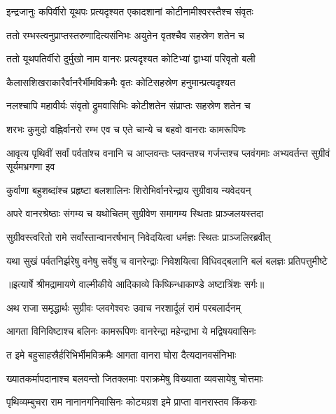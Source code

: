 \twolineshloka
{इन्द्रजानुः कपिर्वीरो यूथपः प्रत्यदृश्यत}
{एकादशानां कोटीनामीश्वरस्तैश्च संवृतः} %

\twolineshloka
{ततो रम्भस्त्वनुप्राप्तस्तरुणादित्यसंनिभः}
{अयुतेन वृतश्चैव सहस्रेण शतेन च} %

\twolineshloka
{ततो यूथपतिर्वीरो दुर्मुखो नाम वानरः}
{प्रत्यदृश्यत कोटिभ्यां द्वाभ्यां परिवृतो बली} %

\twolineshloka
{कैलासशिखराकारैर्वानरैर्भीमविक्रमैः}
{वृतः कोटिसहस्रेण हनुमान्प्रत्यदृश्यत} %

\twolineshloka
{नलश्चापि महावीर्यः संवृतो द्रुमवासिभिः}
{कोटीशतेन संप्राप्तः सहस्रेण शतेन च} %

\twolineshloka
{शरभः कुमुदो वह्निर्वानरो रम्भ एव च}
{एते चान्ये च बहवो वानराः कामरूपिणः} %

\threelineshloka
{आवृत्य पृथिवीं सर्वां पर्वतांश्च वनानि च}
{आप्लवन्तः प्लवन्तश्च गर्जन्तश्च प्लवंगमाः}
{अभ्यवर्तन्त सुग्रीवं सूर्यमभ्रगणा इव} %

\twolineshloka
{कुर्वाणा बहुशब्दांश्च प्रहृष्टा बलशालिनः}
{शिरोभिर्वानरेन्द्राय सुग्रीवाय न्यवेदयन्} %

\twolineshloka
{अपरे वानरश्रेष्ठाः संगम्य च यथोचितम्}
{सुग्रीवेण समागम्य स्थिताः प्राञ्जलयस्तदा} %

\twolineshloka
{सुग्रीवस्त्वरितो रामे सर्वांस्तान्वानरर्षभान्}
{निवेदयित्वा धर्मज्ञः स्थितः प्राञ्जलिरब्रवीत्} %

\fourlineindentedshloka
{यथा सुखं पर्वतनिर्झरेषु}
{ वनेषु सर्वेषु च वानरेन्द्राः}
{निवेशयित्वा विधिवद्बलानि}
{ बलं बलज्ञः प्रतिपत्तुमीष्टे} %


{॥इत्यार्षे श्रीमद्रामायणे वाल्मीकीये आदिकाव्ये किष्किन्धाकाण्डे अष्टात्रिंशः सर्गः॥}


\twolineshloka
{अथ राजा समृद्धार्थः सुग्रीवः प्लवगेश्वरः}
{उवाच नरशार्दूलं रामं परबलार्दनम्} %

\twolineshloka
{आगता विनिविष्टाश्च बलिनः कामरूपिणः}
{वानरेन्द्रा महेन्द्राभा ये मद्विषयवासिनः} %

\twolineshloka
{त इमे बहुसाहस्रैर्हरिभिर्भीमविक्रमैः}
{आगता वानरा घोरा दैत्यदानवसंनिभाः} %

\twolineshloka
{ख्यातकर्मापदानाश्च बलवन्तो जितक्लमाः}
{पराक्रमेषु विख्याता व्यवसायेषु चोत्तमाः} %

\twolineshloka
{पृथिव्यम्बुचरा राम नानानगनिवासिनः}
{कोट्यग्रश इमे प्राप्ता वानरास्तव किंकराः} %

